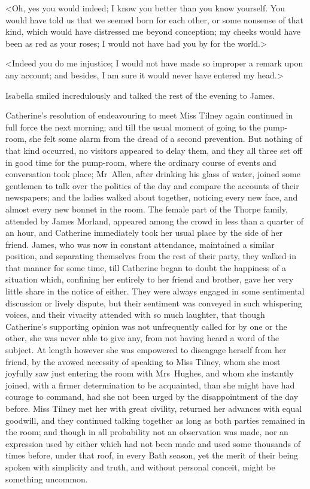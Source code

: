  <Oh, yes you would indeed; I know you better than you know yourself. You would have told us that we seemed born for each other, or some nonsense of that kind, which would have distressed me beyond conception; my cheeks would have been as red as your roses; I would not have had you by for the world.> 

 <Indeed you do me injustice; I would not have made so improper a remark upon any account; and besides, I am sure it would never have entered my head.> 

 Isabella smiled incredulously and talked the rest of the evening to James. 

 Catherine's resolution of endeavouring to meet Miss Tilney again continued in full force the next morning; and till the usual moment of going to the pump-room, she felt some alarm from the dread of a second prevention. But nothing of that kind occurred, no visitors appeared to delay them, and they all three set off in good time for the pump-room, where the ordinary course of events and conversation took place; Mr~Allen, after drinking his glass of water, joined some gentlemen to talk over the politics of the day and compare the accounts of their newspapers; and the ladies walked about together, noticing every new face, and almost every new bonnet in the room. The female part of the Thorpe family, attended by James Morland, appeared among the crowd in less than a quarter of an hour, and Catherine immediately took her usual place by the side of her friend. James, who was now in constant attendance, maintained a similar position, and separating themselves from the rest of their party, they walked in that manner for some time, till Catherine began to doubt the happiness of a situation which, confining her entirely to her friend and brother, gave her very little share in the notice of either. They were always engaged in some sentimental discussion or lively dispute, but their sentiment was conveyed in such whispering voices, and their vivacity attended with so much laughter, that though Catherine's supporting opinion was not unfrequently called for by one or the other, she was never able to give any, from not having heard a word of the subject. At length however she was empowered to disengage herself from her friend, by the avowed necessity of speaking to Miss Tilney, whom she most joyfully saw just entering the room with Mrs~Hughes, and whom she instantly joined, with a firmer determination to be acquainted, than she might have had courage to command, had she not been urged by the disappointment of the day before. Miss Tilney met her with great civility, returned her advances with equal goodwill, and they continued talking together as long as both parties remained in the room; and though in all probability not an observation was made, nor an expression used by either which had not been made and used some thousands of times before, under that roof, in every Bath season, yet the merit of their being spoken with simplicity and truth, and without personal conceit, might be something uncommon. 

